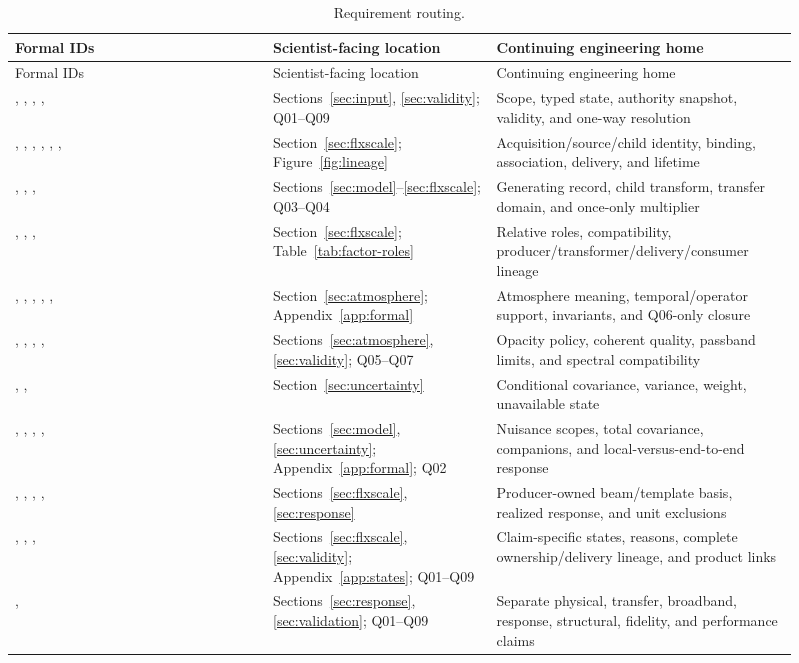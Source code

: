 \begin{longtable}{L{0.30\linewidth}L{0.26\linewidth}L{0.35\linewidth}}
\caption{Requirement routing.}\\
\toprule Formal IDs & Scientist-facing location & Continuing engineering home \\
\midrule\endfirsthead\toprule Formal IDs & Scientist-facing location & Continuing engineering home \\
\midrule\endhead
{}, , , ,  & Sections~\ref{sec:input}, \ref{sec:validity}; Q01--Q09 & Scope, typed state, authority snapshot, validity, and one-way resolution \\
, , , , , ,  & Section~\ref{sec:flxscale}; Figure~\ref{fig:lineage} & Acquisition/source/child identity, binding, association, delivery, and lifetime \\
, , ,  & Sections~\ref{sec:model}--\ref{sec:flxscale}; Q03--Q04 & Generating record, child transform, transfer domain, and once-only multiplier \\
, , ,  & Section~\ref{sec:flxscale}; Table~\ref{tab:factor-roles} & Relative roles, compatibility, producer/transformer/delivery/consumer lineage \\
, , , , ,  & Section~\ref{sec:atmosphere}; Appendix~\ref{app:formal} & Atmosphere meaning, temporal/operator support, invariants, and Q06-only closure \\
, , , ,  & Sections~\ref{sec:atmosphere}, \ref{sec:validity}; Q05--Q07 & Opacity policy, coherent quality, passband limits, and spectral compatibility \\
, ,  & Section~\ref{sec:uncertainty} & Conditional covariance, variance, weight, unavailable state \\
, , , ,  & Sections~\ref{sec:model}, \ref{sec:uncertainty}; Appendix~\ref{app:formal}; Q02 & Nuisance scopes, total covariance, companions, and local-versus-end-to-end response \\
, , , ,  & Sections~\ref{sec:flxscale}, \ref{sec:response} & Producer-owned beam/template basis, realized response, and unit exclusions \\
, , ,  & Sections~\ref{sec:flxscale}, \ref{sec:validity}; Appendix~\ref{app:states}; Q01--Q09 & Claim-specific states, reasons, complete ownership/delivery lineage, and product links \\
,  & Sections~\ref{sec:response}, \ref{sec:validation}; Q01--Q09 & Separate physical, transfer, broadband, response, structural, fidelity, and performance claims \\
\bottomrule
\end{longtable}

